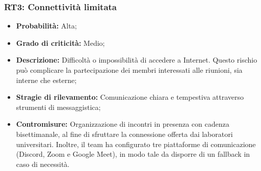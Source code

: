 \subsubsection{RT3: Connettività limitata}
\begin{itemize}
    \item \textbf{Probabilità:} Alta;
    \item \textbf{Grado di criticità:} Medio;
    \item \textbf{Descrizione:} Difficoltà o impossibilità di accedere a Internet. Questo rischio può complicare la partecipazione dei membri interessati alle riunioni, sia interne che esterne;
    \item \textbf{Stragie di rilevamento:} Comunicazione chiara e tempestiva attraverso strumenti di messaggistica;
    \item \textbf{Contromisure:} Organizzazione di incontri in presenza con cadenza bisettimanale, al fine di sfruttare la connessione offerta dai laboratori universitari. Inoltre, il team ha configurato tre piattaforme di comunicazione (Discord, Zoom e Google Meet), in modo tale da disporre di un fallback in caso di necessità.
\end{itemize}
